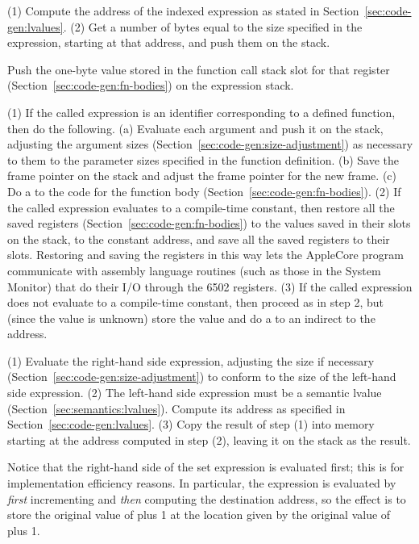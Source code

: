 \documentclass[10pt]{article}
\begin{document}
 (1) Compute the address of the indexed
expression as stated in Section~\ref{sec:code-gen:lvalues}.  (2) Get a
number of bytes equal to the size specified in the expression,
starting at that address, and push them on the stack.

 Push the one-byte value stored in the
function call stack slot for that register
(Section~\ref{sec:code-gen:fn-bodies}) on the expression stack.

 (1) If the called expression is an
identifier corresponding to a defined function, then do the following.
(a) Evaluate each argument and push it on the stack, adjusting the
argument sizes (Section~\ref{sec:code-gen:size-adjustment}) as
necessary to them to the parameter sizes specified in the function
definition. (b) Save the frame pointer on the stack and adjust the
frame pointer for the new frame. (c) Do a  to the code for
the function body (Section~\ref{sec:code-gen:fn-bodies}).  (2) If the
called expression evaluates to a compile-time constant, then restore
all the saved registers (Section~\ref{sec:code-gen:fn-bodies}) to the
values saved in their slots on the stack,  to the constant
address, and save all the saved registers to their slots.  Restoring
and saving the registers in this way lets the AppleCore program
communicate with assembly language routines (such as those in the
System Monitor) that do their I/O through the 6502 registers.  (3) If
the called expression does not evaluate to a compile-time constant,
then proceed as in step 2, but (since the value is unknown) store the
value and do a  to an indirect  to the address.

  (1) Evaluate the right-hand side
expression, adjusting the size if necessary
(Section~\ref{sec:code-gen:size-adjustment}) to conform to the size of
the left-hand side expression.  (2) The left-hand side expression must
be a semantic lvalue (Section~\ref{sec:semantics:lvalues}). Compute
its address as specified in Section~\ref{sec:code-gen:lvalues}.  (3)
Copy the result of step (1) into memory starting at the address
computed in step (2), leaving it on the stack as the result.

Notice that the right-hand side of the set expression is evaluated
first; this is for implementation efficiency reasons.  In particular,
the expression  is evaluated by \emph{first}
incrementing  and \emph{then} computing the destination
address, so the effect is to store the original value of  plus
1 at the location given by the original value of  plus 1.
\end{document}
